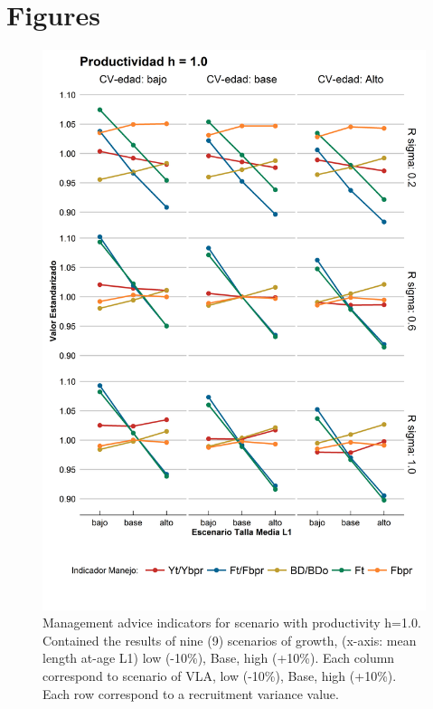 \documentclass[11pt,letter,]{article}
\begin{document}
\clearpage
\section{Figures}


\begin{figure}[ht]
	\begin{center}
\includegraphics[width=0.70\columnwidth]{figures/steepness-10-var.png}
  \end{center}
\caption{Management advice indicators for scenario with productivity h=1.0. Contained the results of nine (9) scenarios of growth, (x-axis: mean length at-age L1) low (-10\%), Base, high (+10\%). Each column correspond to scenario of VLA, low (-10\%), Base, high (+10\%). Each row correspond to a recruitment variance value.}
\label{figure1}
\end{figure}
\end{document}
